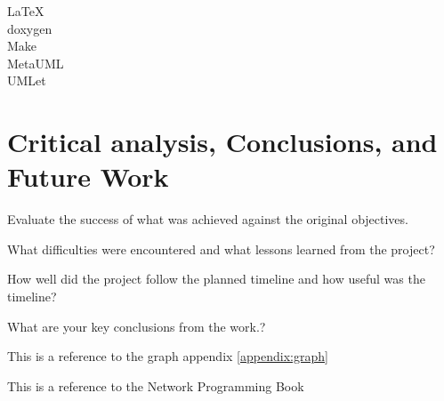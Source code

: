 \documentclass[12pt,a4paper,titlepage]{article}
\begin{document}
LaTeX\\
doxygen\\
Make\\
MetaUML\\
UMLet\\

\section{Critical analysis, Conclusions, and Future Work}

Evaluate the success of what was achieved against the original objectives. 

What difficulties were encountered and what lessons learned from the project? 

How well did the project follow the planned timeline and how useful was the timeline?  

What are your key conclusions from the work.?

This is a reference to the graph appendix \ref{appendix:graph}

This is a reference to the Network Programming Book \cite[p.~215]{stevensunp}

\newpage
\end{document}
